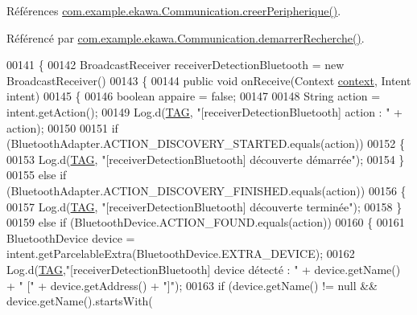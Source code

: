 Références \hyperlink{_communication_8java_source_l00365}{com.\+example.\+ekawa.\+Communication.\+creer\+Peripherique()}.



Référencé par \hyperlink{_communication_8java_source_l00350}{com.\+example.\+ekawa.\+Communication.\+demarrer\+Recherche()}.


\begin{DoxyCode}
00141     \{
00142         BroadcastReceiver receiverDetectionBluetooth = \textcolor{keyword}{new} BroadcastReceiver()
00143         \{
00144             \textcolor{keyword}{public} \textcolor{keywordtype}{void} onReceive(Context \hyperlink{classcom_1_1example_1_1ekawa_1_1_communication_aa5ae3c4eaab6ec31d3b358431e812d00}{context}, Intent intent)
00145             \{
00146                 \textcolor{keywordtype}{boolean} appaire = \textcolor{keyword}{false};
00147 
00148                 String action = intent.getAction();
00149                 Log.d(\hyperlink{classcom_1_1example_1_1ekawa_1_1_communication_af355bac38153a4e6d1cda0b3e74bc1c7}{TAG}, \textcolor{stringliteral}{"[receiverDetectionBluetooth] action : "} + action);
00150 
00151                 \textcolor{keywordflow}{if} (BluetoothAdapter.ACTION\_DISCOVERY\_STARTED.equals(action))
00152                 \{
00153                     Log.d(\hyperlink{classcom_1_1example_1_1ekawa_1_1_communication_af355bac38153a4e6d1cda0b3e74bc1c7}{TAG}, \textcolor{stringliteral}{"[receiverDetectionBluetooth] découverte démarrée"});
00154                 \}
00155                 \textcolor{keywordflow}{else} \textcolor{keywordflow}{if} (BluetoothAdapter.ACTION\_DISCOVERY\_FINISHED.equals(action))
00156                 \{
00157                     Log.d(\hyperlink{classcom_1_1example_1_1ekawa_1_1_communication_af355bac38153a4e6d1cda0b3e74bc1c7}{TAG}, \textcolor{stringliteral}{"[receiverDetectionBluetooth] découverte terminée"});
00158                 \}
00159                 \textcolor{keywordflow}{else} \textcolor{keywordflow}{if} (BluetoothDevice.ACTION\_FOUND.equals(action))
00160                 \{
00161                     BluetoothDevice device = intent.getParcelableExtra(BluetoothDevice.EXTRA\_DEVICE);
00162                     Log.d(\hyperlink{classcom_1_1example_1_1ekawa_1_1_communication_af355bac38153a4e6d1cda0b3e74bc1c7}{TAG},\textcolor{stringliteral}{"[receiverDetectionBluetooth] device détecté : "} + device.getName() + \textcolor{stringliteral}{" ["}
       + device.getAddress() + \textcolor{stringliteral}{"]"});
00163                     \textcolor{keywordflow}{if} (device.getName() != null && device.getName().startsWith(

\end{DoxyCode}
